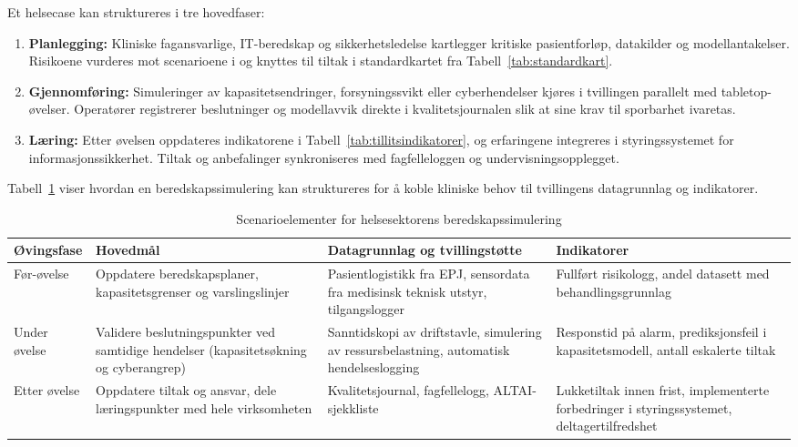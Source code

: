 Et helsecase kan struktureres i tre hovedfaser:
\begin{enumerate}
    \item \textbf{Planlegging:} Kliniske fagansvarlige, IT-beredskap og sikkerhetsledelse kartlegger kritiske pasientforløp, datakilder og modellantakelser. Risikoene vurderes mot scenarioene i \citet{dsb2023nrb} og knyttes til tiltak i standardkartet fra Tabell~\ref{tab:standardkart}.
    \item \textbf{Gjennomføring:} Simuleringer av kapasitetsendringer, forsyningssvikt eller cyberhendelser kjøres i tvillingen parallelt med tabletop-øvelser. Operatører registrerer beslutninger og modellavvik direkte i kvalitetsjournalen slik at \citet{dnv2023digitalassurance} sine krav til sporbarhet ivaretas.
    \item \textbf{Læring:} Etter øvelsen oppdateres indikatorene i Tabell~\ref{tab:tillitsindikatorer}, og erfaringene integreres i styringssystemet for informasjonssikkerhet. Tiltak og anbefalinger synkroniseres med fagfelleloggen og undervisningsopplegget.
\end{enumerate}

Tabell~\ref{tab:helseberedskap} viser hvordan en beredskapssimulering kan struktureres for å koble kliniske behov til tvillingens datagrunnlag og indikatorer.

\begin{table}[ht]
    \centering
    \caption{Scenarioelementer for helsesektorens beredskapssimulering}
    \label{tab:helseberedskap}
    \begin{tabular}{|p{3.0cm}|p{4.6cm}|p{4.6cm}|p{3.0cm}|}
        \hline
        \textbf{Øvingsfase} & \textbf{Hovedmål} & \textbf{Datagrunnlag og tvillingstøtte} & \textbf{Indikatorer} \\
        \hline
        Før-øvelse & Oppdatere beredskapsplaner, kapasitetsgrenser og varslingslinjer & Pasientlogistikk fra EPJ, sensordata fra medisinsk teknisk utstyr, tilgangslogger & Fullført risikologg, andel datasett med behandlingsgrunnlag \\
        \hline
        Under øvelse & Validere beslutningspunkter ved samtidige hendelser (kapasitetsøkning og cyberangrep) & Sanntidskopi av driftstavle, simulering av ressursbelastning, automatisk hendelseslogging & Responstid på alarm, prediksjonsfeil i kapasitetsmodell, antall eskalerte tiltak \\
        \hline
        Etter øvelse & Oppdatere tiltak og ansvar, dele læringspunkter med hele virksomheten & Kvalitetsjournal, fagfellelogg, ALTAI-sjekkliste & Lukketiltak innen frist, implementerte forbedringer i styringssystemet, deltagertilfredshet \\
        \hline
    \end{tabular}
\end{table}

